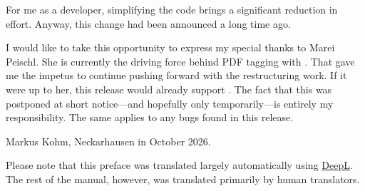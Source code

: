 For me as a developer, simplifying the code brings a significant reduction in
effort. Anyway, this change had been announced a long time ago.

I would like to take this opportunity to express my special thanks to Marei
Peischl.  She is currently the driving force behind PDF tagging with
\KOMAScript. That gave me the impetus to continue pushing forward with the
restructuring work. If it were up to her, this release would already support
. The fact that this was postponed at short notice—and
hopefully only temporarily—is entirely my responsibility. The same applies to
any bugs found in this release.

\bigskip\noindent
Markus Kohm, Neckarhausen in October 2026.

\bigskip\bigskip\noindent Please note that this preface was translated largely automatically
using \href{https://www.deepl.com}{DeepL}. The rest of the manual, however,
was translated primarily by human translators.

\endinput


